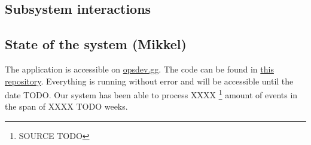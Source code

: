 \documentclass{article}
\begin{document}


\subsection{Subsystem interactions}

\subsection{State of the system (Mikkel)}

The application is accessible on \url{opsdev.gg}. The code can be found in \href{https://github.com/MinitwitGroupI/MiniTwit}{this repository}. Everything is running without error and will be accessible until the date TODO.
Our system has been able to process XXXX \footnote{SOURCE TODO} amount of events in the span of XXXX TODO weeks.
\end{document}
